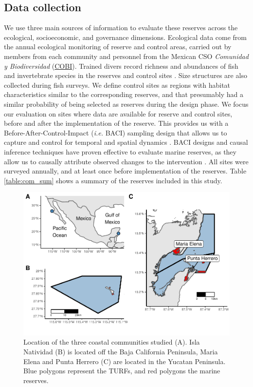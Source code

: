 \documentclass{frontiersSCNS}
\begin{document}
\subsection{Data collection}\label{data-collection}

We use three main sources of information to evaluate these reserves
across the ecological, socioeconomic, and governance dimensions.
Ecological data come from the annual ecological monitoring of reserve
and control areas, carried out by members from each community and
personnel from the Mexican CSO \emph{Comunidad y Biodiversidad}
(\href{www.cobi.org.mx}{COBI}). Trained divers record richness and
abundances of fish and invertebrate species in the reserves and control
sites \citep{fulton_2018}. Size structures are also collected during
fish surveys. We define control sites as regions with habitat
characteristics similar to the corresponding reserves, and that
presumably had a similar probability of being selected as reserves
during the design phase. We focus our evaluation on sites where data are
available for reserve and control sites, before and after the
implementation of the reserve. This provides us with a
Before-After-Control-Impact (\emph{i.e.} BACI) sampling design that
allows us to capture and control for temporal and spatial dynamics
\citep{depalma_2018,ferraro_2006-oW}. BACI designs and causal inference
techniques have proven effective to evaluate marine reserves, as they
allow us to causally attribute observed changes to the intervention
\citep{moland_2013-VP,Villasenor-Derbez_2018}. All sites were surveyed
annually, and at least once before implementation of the reserves. Table
\ref{table:com_sum} shows a summary of the reserves included in this
study.

\begin{figure}
\centering
\includegraphics{Villasenor-Derbez_files/figure-latex/unnamed-chunk-1-1.pdf}
\caption{\label{fig:unnamed-chunk-1}\label{fig:map}Location of the three
coastal communities studied (A). Isla Natividad (B) is located off the
Baja California Peninsula, Maria Elena and Punta Herrero (C) are located
in the Yucatan Peninsula. Blue polygons represent the TURFs, and red
polygons the marine reserves.}
\end{figure}
\end{document}
